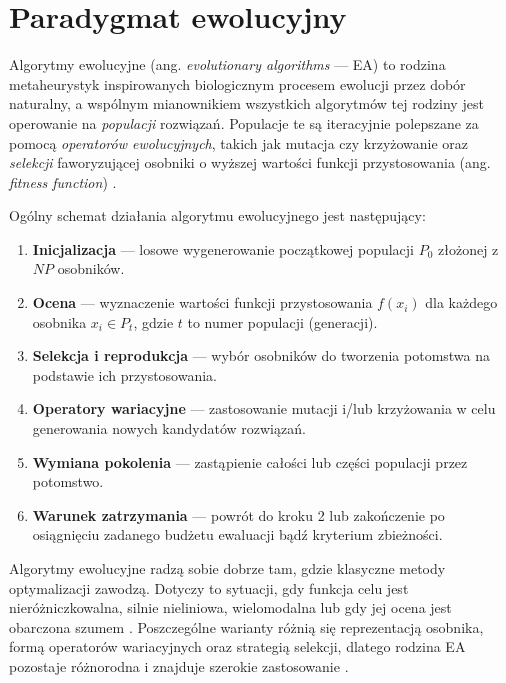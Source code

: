 \section{Paradygmat ewolucyjny}

Algorytmy ewolucyjne (ang. \textit{evolutionary algorithms} --- EA) to rodzina metaheurystyk inspirowanych biologicznym procesem ewolucji przez dobór naturalny, a wspólnym mianownikiem wszystkich algorytmów tej rodziny jest operowanie na \textit{populacji} rozwiązań. Populacje te są iteracyjnie polepszane za pomocą \textit{operatorów ewolucyjnych}, takich jak mutacja czy krzyżowanie oraz \textit{selekcji} faworyzującej osobniki o wyższej wartości funkcji przystosowania (ang. \textit{fitness function}) \cite{Katoch2021}.

Ogólny schemat działania algorytmu ewolucyjnego jest następujący:
\begin{enumerate}
\item \textbf{Inicjalizacja} --- losowe wygenerowanie początkowej populacji $P_0$ złożonej z $NP$ osobników.
\item \textbf{Ocena} --- wyznaczenie wartości funkcji przystosowania $f(x_i)$ dla każdego osobnika $x_i \in P_t$, gdzie $t$ to numer populacji (generacji).
\item \textbf{Selekcja i reprodukcja} --- wybór osobników do tworzenia potomstwa na podstawie ich przystosowania.
\item \textbf{Operatory wariacyjne} --- zastosowanie mutacji i/lub krzyżowania w celu generowania nowych kandydatów rozwiązań.
\item \textbf{Wymiana pokolenia} --- zastąpienie całości lub części populacji przez potomstwo.
\item \textbf{Warunek zatrzymania} --- powrót do kroku 2 lub zakończenie po osiągnięciu zadanego budżetu ewaluacji bądź kryterium zbieżności.
\end{enumerate}

Algorytmy ewolucyjne radzą sobie dobrze tam, gdzie klasyczne metody optymalizacji zawodzą. Dotyczy to sytuacji, gdy funkcja celu jest nieróżniczkowalna, silnie nieliniowa, wielomodalna lub gdy jej ocena jest obarczona szumem \cite{Bilal2020}. Poszczególne warianty różnią się reprezentacją osobnika, formą operatorów wariacyjnych oraz strategią selekcji, dlatego rodzina EA pozostaje różnorodna i znajduje szerokie zastosowanie \cite{TogeliusYannakakis2023}.
